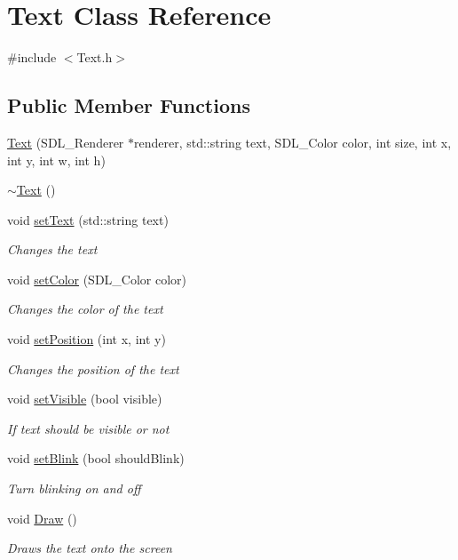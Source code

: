 \hypertarget{class_text}{}\section{Text Class Reference}
\label{class_text}


{\ttfamily \#include $<$Text.\+h$>$}

\subsection*{Public Member Functions}
\begin{DoxyCompactItemize}
\item 
\mbox{\hyperlink{class_text_a1a244ff955d98640e0046acef0659413}{Text}} (S\+D\+L\+\_\+\+Renderer $\ast$renderer, std\+::string text, S\+D\+L\+\_\+\+Color color, int size, int x, int y, int w, int h)
\item 
\mbox{\hyperlink{class_text_a2d49e5c280e205125b149f7777ae30c7}{$\sim$\+Text}} ()
\item 
void \mbox{\hyperlink{class_text_ab2d8c95b3d746ae3e8c0fba8318743c9}{set\+Text}} (std\+::string text)
\begin{DoxyCompactList}\small\item\em Changes the text \end{DoxyCompactList}\item 
void \mbox{\hyperlink{class_text_abb8e725b17de08304a97119d39df5cc1}{set\+Color}} (S\+D\+L\+\_\+\+Color color)
\begin{DoxyCompactList}\small\item\em Changes the color of the text \end{DoxyCompactList}\item 
void \mbox{\hyperlink{class_text_a55995c22d9a3166ccd856f3b632f2354}{set\+Position}} (int x, int y)
\begin{DoxyCompactList}\small\item\em Changes the position of the text \end{DoxyCompactList}\item 
void \mbox{\hyperlink{class_text_a654ac74524e48652f9aa789d2612052b}{set\+Visible}} (bool visible)
\begin{DoxyCompactList}\small\item\em If text should be visible or not \end{DoxyCompactList}\item 
void \mbox{\hyperlink{class_text_aa3075bc13723baa1a72bdd2a2a1ba509}{set\+Blink}} (bool should\+Blink)
\begin{DoxyCompactList}\small\item\em Turn blinking on and off \end{DoxyCompactList}\item 
void \mbox{\hyperlink{class_text_af4bb084ff0f66ad827ef6b006f9b0ebd}{Draw}} ()
\begin{DoxyCompactList}\small\item\em Draws the text onto the screen \end{DoxyCompactList}\end{DoxyCompactItemize}
